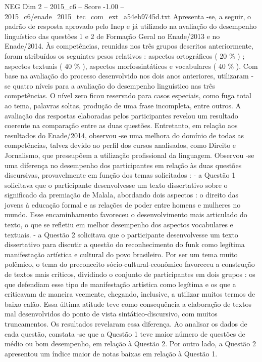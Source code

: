 \begin{textsample}{NEG Dim 2 – 2015\_c6 – Score -1.00 – 2015\_c6/enade\_2015\_tec\_com\_ext\_a54eb9745d.txt}
Apresenta -se, a seguir, o padrão de resposta aprovado pelo Inep e já utilizado na avaliação do desempenho linguístico das questões 1 e 2 de Formação Geral no Enade/2013 e no Enade/2014.
Às competências, reunidas nos três grupos descritos anteriormente, foram atribuídos os seguintes pesos relativos : aspectos ortográficos ( 20 \% ) ; aspectos textuais ( 40 \% ), aspectos morfossintáticos e vocabulares ( 40 \% ).
Com base na avaliação do processo desenvolvido nos dois anos anteriores, utilizaram -se quatro níveis para a avaliação do desempenho linguístico nas três competências.
O nível zero ficou reservado para casos especiais, como fuga total ao tema, palavras soltas, produção de uma frase incompleta, entre outros.
A avaliação das respostas elaboradas pelos participantes revelou um resultado coerente na comparação entre as duas questões.
Entretanto, em relação aos resultados do Enade/2014, observou -se uma melhora do domínio de todas as competências, talvez devido ao perfil dos cursos analisados, como Direito e Jornalismo, que pressupõem a utilização profissional da linguagem.
Observou -se uma diferença no desempenho dos participantes em relação às duas questões discursivas, provavelmente em função dos temas solicitados : - a Questão 1 solicitava que o participante desenvolvesse um texto dissertativo sobre o significado da premiação de Malala, abordando dois aspectos : o direito das jovens à educação formal e as relações de poder entre homens e mulheres no mundo.
Esse encaminhamento favoreceu o desenvolvimento mais articulado do texto, o que se refletiu em melhor desempenho dos aspectos vocabulares e textuais. - a Questão 2 solicitava que o participante desenvolvesse um texto dissertativo para discutir a questão do reconhecimento do funk como legítima manifestação artística e cultural do povo brasileiro.
Por ser um tema muito polêmico, o tema do preconceito sócio-cultural-econômico favoreceu a construção de textos mais críticos, dividindo o conjunto de participantes em dois grupos : os que defendiam esse tipo de manifestação artística como legítima e os que a criticavam de maneira veemente, chegando, inclusive, a utilizar muitos termos de baixo calão.
Essa última atitude teve como consequência a elaboração de textos mal desenvolvidos do ponto de vista sintático-discursivo, com muitos truncamentos.
Os resultados revelaram essa diferença.
Ao analisar os dados de cada questão, constata -se que a Questão 1 teve maior número de questões de médio ou bom desempenho, em relação à Questão 2.
Por outro lado, a Questão 2 apresentou um índice maior de notas baixas em relação à Questão 1.

\end{textsample}
